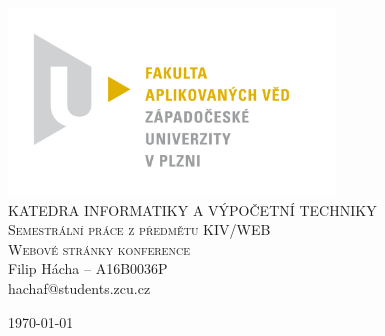 \documentclass[12pt, a4paper]{article}
\begin{document}
\newcommand{\obrazek}[1]{Obrázek \ref{#1}}
\newcommand{\tabulka}[1]{Tabulka \ref{#1}}

\begin{titlepage}
\begin{center}
\includegraphics[width=0.65\textwidth]{fav.png} \\[0.5cm]  %
\textsc{\Large KATEDRA INFORMATIKY A VÝPOČETNÍ TECHNIKY }\\[1cm]

\textsc{\Large Semestrální práce z předmětu KIV/WEB}\\[1cm]

\textsc{\Large Webové stránky konference}\\[0.5cm]

{\large Filip Hácha -- A16B0036P} \\[0.5cm]
{\large hachaf@students.zcu.cz}

\vfill
{\large \today}

\end{center}
\end{titlepage}


\tableofcontents %
\newpage
\end{document}
